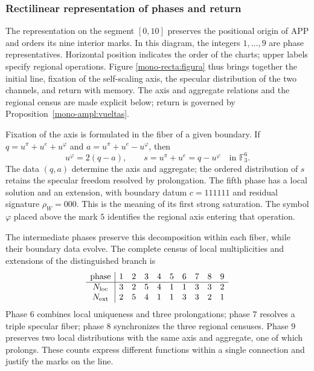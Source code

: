 \clearpage
\subsubsection{Rectilinear representation of phases and return}
\label{mono-recta:desarrollo}

The representation on the segment \([0,10]\) preserves the positional
origin of APP and orders its nine interior marks. In this diagram,
the integers \(1,\ldots,9\) are phase representatives. Horizontal
position indicates the order of the charts; upper labels
specify regional operations. Figure
\ref{mono-recta:figura} thus brings together the initial line, fixation of the
self-scaling axis, the specular distribution of the two channels, and
return with memory. The axis and aggregate relations and the regional
census are made explicit below; return is governed by
Proposition~\ref{mono-ampl:vueltas}.



Fixation of the axis is formulated in the fiber of a given boundary. If
\(q=u^\pi+u^e+u^\varphi\) and
\(a=u^\pi+u^e-u^\varphi\), then
\[
 u^\varphi=2(q-a),\qquad s=u^\pi+u^e=q-u^\varphi
 \quad\text{in }\mathbb F_3^6.
\]
The data \((q,a)\) determine the axis and aggregate; the ordered distribution
of \(s\) retains the specular freedom resolved by prolongation.
The fifth phase has a local solution and an extension, with boundary
datum \(c=111111\) and residual signature \(\rho_W=000\). This is the
meaning of its first strong saturation. The symbol \(\varphi\)
placed above the mark \(5\) identifies the regional axis entering
that operation.

The intermediate phases preserve this decomposition within each fiber,
while their boundary data evolve. The complete census of local
multiplicities and extensions of the distinguished branch is
\[
\begin{array}{c|rrrrrrrrr}
\text{phase}&1&2&3&4&5&6&7&8&9\\\hline
N_{\rm loc}&3&2&5&4&1&1&3&3&2\\
N_{\rm ext}&2&5&4&1&1&3&3&2&1
\end{array}
\]
Phase \(6\) combines local uniqueness and three prolongations; phase
\(7\) resolves a triple specular fiber; phase \(8\) synchronizes
the three regional censuses. Phase \(9\) preserves two local
distributions with the same axis and aggregate, one of which
prolongs. These counts express different functions within a
single connection and justify the marks on the line.

